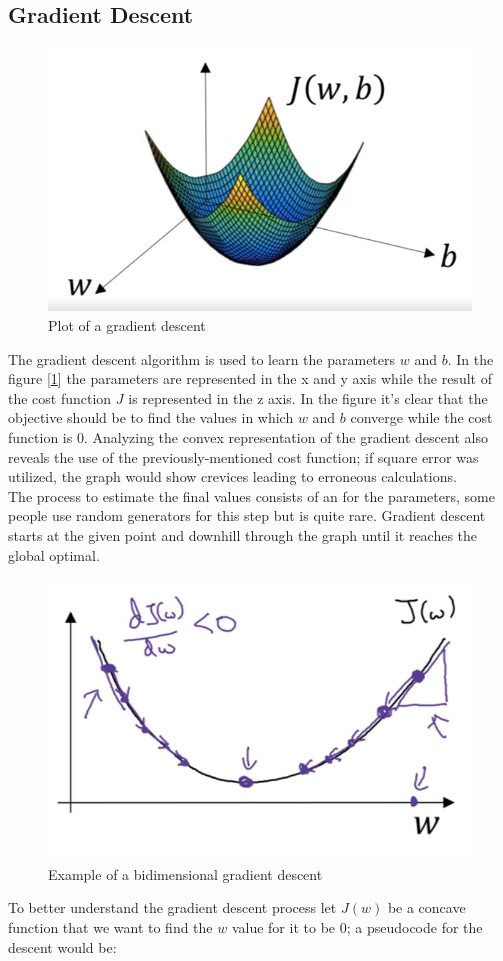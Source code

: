 \documentclass[11pt]{report}
\begin{document}
\subsection{Gradient Descent}
\begin{figure}
    \centering
    \includegraphics[width = .50\textwidth]{GD.png}
    \caption{Plot of a gradient descent} \label{fig:F3}
\end{figure}
The gradient descent algorithm is used to learn the parameters $w$ and $b$. In the figure [\ref{fig:F3}] the parameters are represented in the x and y axis while the result of the cost function $J$ is represented in the z axis. In the figure it's clear that the objective should be to find the values in which $w$ and $b$ converge while the cost function is 0. Analyzing the convex representation of the gradient descent also reveals the use of the previously-mentioned cost function; if square error was utilized, the graph would show crevices leading to erroneous calculations.\\
The process to estimate the final values consists of an  for the parameters, some people use random generators for this step but is quite rare. Gradient descent starts at the given point and  downhill through the graph until it reaches the global optimal.
\newpage
\begin{figure}
    \centering
    \includegraphics[width = .50\textwidth]{GDE.png}
    \caption{Example of a bidimensional gradient descent} \label{fig:F4}
\end{figure}
To better understand the gradient descent process let $J(w)$ be a concave function that we want to find the $w$ value for it to be 0; a pseudocode for the descent would be:
\end{document}
